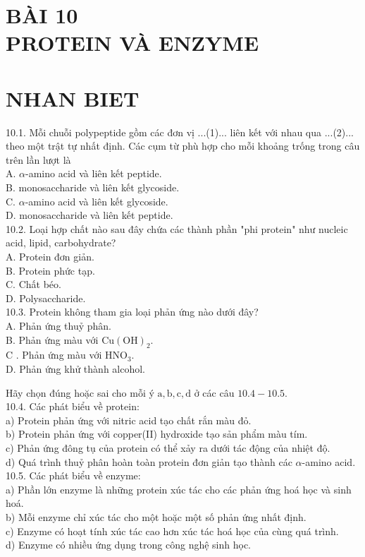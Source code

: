 \documentclass[10pt]{article}
\begin{document}
\section*{BÀI 10 \\
 PROTEIN VÀ ENZYME}
\section*{NHAN BIET}
10.1. Mỗi chuỗi polypeptide gồm các đơn vị ...(1)... liên kết với nhau qua ...(2)... theo một trật tự nhất định. Các cụm từ phù hợp cho mỗi khoảng trống trong câu trên lần lượt là\\
A. $\alpha$-amino acid và liên kết peptide.\\
B. monosaccharide và liên kết glycoside.\\
C. $\alpha$-amino acid và liên kết glycoside.\\
D. monosaccharide và liên kết peptide.\\
10.2. Loại hợp chất nào sau đây chứa các thành phần "phi protein" như nucleic acid, lipid, carbohydrate?\\
A. Protein đơn giản.\\
B. Protein phức tạp.\\
C. Chất béo.\\
D. Polysaccharide.\\
10.3. Protein không tham gia loại phản ứng nào dưới đây?\\
A. Phản ứng thuỷ phân.\\
B. Phản ứng màu với $\mathrm{Cu}(\mathrm{OH})_{2}$.\\
C . Phản ứng màu với $\mathrm{HNO}_{3}$.\\
D. Phản ứng khử thành alcohol.

Hãy chọn đúng hoặc sai cho mỗi ý $\mathrm{a}, \mathrm{b}, \mathrm{c}, \mathrm{d}$ ở các câu $10.4-10.5$.\\
10.4. Các phát biểu về protein:\\
a) Protein phản ứng với nitric acid tạo chất rắn màu đỏ.\\
b) Protein phản ứng với copper(II) hydroxide tạo sản phẩm màu tím.\\
c) Phản ứng đông tụ của protein có thể xảy ra dưới tác động của nhiệt độ.\\
d) Quá trình thuỷ phân hoàn toàn protein đơn giản tạo thành các $\alpha$-amino acid.\\
10.5. Các phát biểu về enzyme:\\
a) Phần lớn enzyme là những protein xúc tác cho các phản ứng hoá học và sinh hoá.\\
b) Mỗi enzyme chỉ xúc tác cho một hoặc một số phản ứng nhất định.\\
c) Enzyme có hoạt tính xúc tác cao hơn xúc tác hoá học của cùng quá trình.\\
d) Enzyme có nhiều ứng dụng trong công nghệ sinh học.
\end{document}
